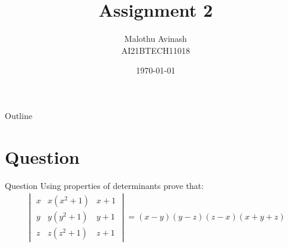 \documentclass{beamer}
\title{Assignment 2}%
\author{Malothu Avinash \\ AI21BTECH11018}
\date{\today}
\newcommand{\mydet}[1]{\ensuremath{\begin{vmatrix}#1\end{vmatrix}}}
\begin{document}
\begin{frame}
    \titlepage 
\end{frame}



\begin{frame}{Outline}
    \tableofcontents
\end{frame}


\section{Question}
\begin{frame}{Question}
    Using properties of determinants prove that:
    \begin{align}
    \mydet{x & x(x^2+1) & x+1\\y & y(y^2+1) & y+1\\z & z(z^2+1) & z+1} = (x-y)(y-z)(z-x)(x+y+z)
    \end{align}
\end{frame}
\end{document}

